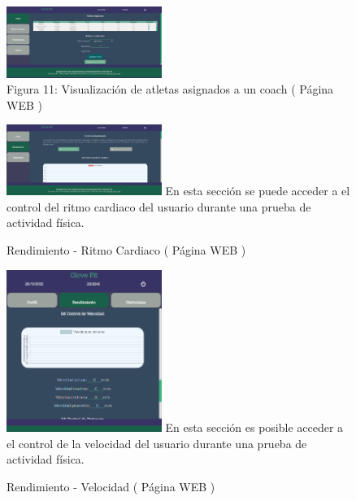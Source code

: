 \documentclass[osajnl,twocolumn,showpacs,superscriptaddress,10pt]{revtex4-1}
\begin{document}
\begin{figure} [H] \centering 
\caption{Figura 11: Visualización de atletas asignados a un coach ( Página WEB )}
\includegraphics[width=0.45\textwidth]{AsigAtle.jpg}
\end{figure}
\begin{figure} [H] \centering 
\caption{Rendimiento - Ritmo Cardiaco
 ( Página WEB )}
\includegraphics[width=0.45\textwidth]{00rendimiento.png}
\newline En esta sección se puede acceder a el control del ritmo cardiaco del usuario durante una prueba de actividad física.
\end{figure}

\begin{figure} [H] \centering 
\caption{Rendimiento - Velocidad
 ( Página WEB )}
\includegraphics[width=0.45\textwidth]{01rendimiento2.png}
\newline En esta sección es posible acceder a el control de la velocidad del usuario durante una prueba de actividad física.
\end{figure}
\end{document}
